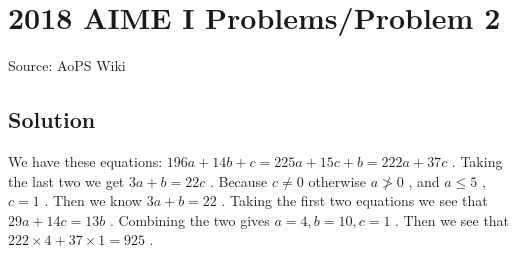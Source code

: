 \documentclass[12pt]{article}
\begin{document}
\section*{{2018 AIME I Problems/Problem 2}}
Source: AoPS Wiki

\subsection*{Solution}
We have these equations: $196a+14b+c=225a+15c+b=222a+37c$ .
Taking the last two we get $3a+b=22c$ . Because $c \neq 0$ otherwise $a \ngtr 0$ , and $a \leq 5$ , $c=1$ . Then we know $3a+b=22$ .
Taking the first two equations we see that $29a+14c=13b$ . Combining the two gives $a=4, b=10, c=1$ . Then we see that $222 \times 4+37 \times1=\boxed{925}$ .
\end{document}
